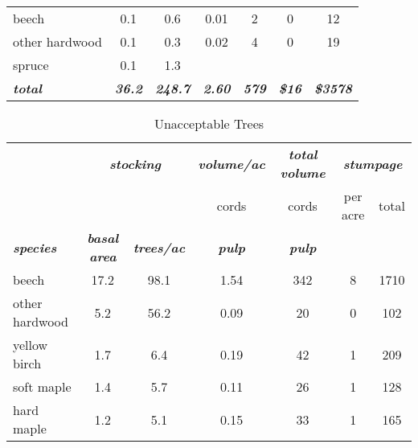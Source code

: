 \documentclass[landscape]{article}
\begin{document}
\begin{table}[H]
\begin{tabular}[t]{lcccccc}
beech & 0.1 & 0.6 & 0.01 & 2 & 0 & 12\\
 
\rowcolor{gray!6}  other hardwood & 0.1 & 0.3 & 0.02 & 4 & 0 & 19\\
 
spruce & 0.1 & 1.3 &  &  &  & \\
 
\rowcolor{gray!6}  \rowcolor[HTML]{DCDCDC}  \em{\textbf{total}} & \em{\textbf{36.2}} & \em{\textbf{248.7}} & \em{\textbf{2.60}} & \em{\textbf{579}} & \em{\textbf{\$16}} & \em{\textbf{\$3578}}\\
\bottomrule
\end{tabular}
\end{table}

\begin{table}[H]

\caption{\label{tab:unnamed-chunk-8}Unacceptable Trees}
\fontsize{10}{12}\selectfont
\begin{tabular}[t]{lcccccc}
\toprule
\multicolumn{1}{c}{\em{\textbf{ }}} & \multicolumn{2}{c}{\em{\textbf{stocking}}} & \multicolumn{1}{c}{\em{\textbf{volume/ac }}} & \multicolumn{1}{c}{\em{\textbf{total volume}}} & \multicolumn{2}{c}{\em{\textbf{stumpage}}} \\
\cmidrule(l{3pt}r{3pt}){2-3} \cmidrule(l{3pt}r{3pt}){4-4} \cmidrule(l{3pt}r{3pt}){5-5} \cmidrule(l{3pt}r{3pt}){6-7}
\multicolumn{3}{c}{ } & \multicolumn{1}{c}{cords} & \multicolumn{1}{c}{cords} & \multicolumn{1}{c}{per acre} & \multicolumn{1}{c}{total} \\
\cmidrule(l{3pt}r{3pt}){4-4} \cmidrule(l{3pt}r{3pt}){5-5} \cmidrule(l{3pt}r{3pt}){6-6} \cmidrule(l{3pt}r{3pt}){7-7}
\rowcolor[HTML]{DCDCDC}  \em{\textbf{species}} & \em{\textbf{basal area}} & \em{\textbf{trees/ac}} & \em{\textbf{pulp}} & \em{\textbf{pulp}} & \em{\textbf{ }} & \em{\textbf{ }}\\
\midrule
\rowcolor{gray!6}  beech & 17.2 & 98.1 & 1.54 & 342 & 8 & 1710\\
 
other hardwood & 5.2 & 56.2 & 0.09 & 20 & 0 & 102\\
 
\rowcolor{gray!6}  yellow birch & 1.7 & 6.4 & 0.19 & 42 & 1 & 209\\
 
soft maple & 1.4 & 5.7 & 0.11 & 26 & 1 & 128\\
 
\rowcolor{gray!6}  hard maple & 1.2 & 5.1 & 0.15 & 33 & 1 & 165\\
 

\end{tabular}
\end{table}
\end{document}
